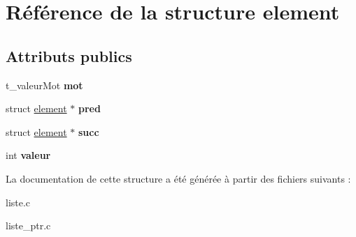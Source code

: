 \hypertarget{structelement}{\section{Référence de la structure element}
\label{structelement}
}
\subsection*{Attributs publics}
\begin{DoxyCompactItemize}
\item 
\hypertarget{structelement_a22116a64cb482e226cc090caf3f841e6}{t\-\_\-valeur\-Mot {\bfseries mot}}\label{structelement_a22116a64cb482e226cc090caf3f841e6}

\item 
\hypertarget{structelement_a965240f16a2a6d7ffa5cb91b13b0674c}{struct \hyperlink{structelement}{element} $\ast$ {\bfseries pred}}\label{structelement_a965240f16a2a6d7ffa5cb91b13b0674c}

\item 
\hypertarget{structelement_a138b31c29756e5a68001494fee11be3a}{struct \hyperlink{structelement}{element} $\ast$ {\bfseries succ}}\label{structelement_a138b31c29756e5a68001494fee11be3a}

\item 
\hypertarget{structelement_a909be7727fbe560744896d0a07521125}{int {\bfseries valeur}}\label{structelement_a909be7727fbe560744896d0a07521125}

\end{DoxyCompactItemize}


La documentation de cette structure a été générée à partir des fichiers suivants \-:\begin{DoxyCompactItemize}
\item 
liste.\-c\item 
liste\-\_\-ptr.\-c\end{DoxyCompactItemize}
